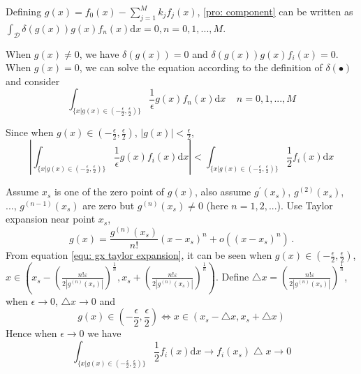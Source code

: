 Defining $g(x) = f_0(x) - \sum_{j=1}^{M} k_jf_j(x)$, \eqref{pro: component} can be written as $\int_{\mathcal{D}}\delta(g(x))g(x)f_n(x)\mathrm{d}x = 0, n = 0, 1, ..., M$.

When $g(x) \neq 0$, we have $\delta(g(x)) = 0$ and $\delta(g(x))g(x)f_i(x) = 0$.   When  $g(x) = 0$, we can solve the equation according to the definition of $\delta(\bullet)$ and consider
\begin{equation}
\label{pro: important}
\int_{\{x|g(x)\in (-\frac{\epsilon}{2}, \frac{\epsilon}{2})\}} \frac{1}{\epsilon} g(x)f_n(x) \mathrm{d}x\;\;\;\;n=0, 1, ..., M
\end{equation}

Since when $g(x) \in (-\frac{\epsilon}{2}, \frac{\epsilon}{2})$, $|g(x)| < \frac{\epsilon}{2}$,
\begin{equation}|
\int_{\{x|g(x)\in (-\frac{\epsilon}{2}, \frac{\epsilon}{2})\}} \frac{1}{\epsilon} g(x)f_i(x) \mathrm{d}x | <
\int_{\{x|g(x)\in (-\frac{\epsilon}{2}, \frac{\epsilon}{2})\}} \frac{1}{2}f_i(x) \mathrm{d}x
\end{equation}

Assume $x_s$ is one of the zero point of $g(x)$, also assume $g^\prime(x_s)$, $g^{(2)}(x_s)$, ..., $g^{(n-1)}(x_s)$ are zero but $g^{(n)}(x_s) \neq 0$ (here $n = 1, 2, ...$). Use Taylor expansion near point $x_s$,
\begin{equation}
  \label{equ: gx taylor expansion}
  g(x) = \frac{g^{(n)}(x_s)}{n!}(x - x_s)^n + o((x - x_s)^n)\,.
\end{equation}
\def \LEFT{ x_s
  -\left(\frac{n!\varepsilon}{2|g^{(n)}(x_s)|}\right)^{\frac{1}{n}}}
  \def \RIGHT{ x_s
  +\left(\frac{n!\varepsilon}{2|g^{(n)}(x_s)|}\right)^{\frac{1}{n}}}
From equation \eqref{equ: gx taylor expansion}, it can be seen when $g(x)\in (-\frac{\epsilon}{2}, \frac{\epsilon}{2})$, $x \in \left(
      \LEFT, \RIGHT
  \right)$.  Define $\bigtriangleup x = \left(\frac{n!\varepsilon}{2|g^{(n)}(x_s)|}\right)^{\frac{1}{n}}$, when $\epsilon \rightarrow 0$, $\bigtriangleup x \rightarrow 0$ and
\begin{equation}
\label{pro: scale}
g(x) \in (-\frac{\epsilon}{2}, \frac{\epsilon}{2})  \Leftrightarrow x \in (x_s -\bigtriangleup x, x_s + \bigtriangleup x)
\end{equation}
 Hence when $\epsilon \rightarrow 0$ we have
\begin{equation}
\int_{\{x|g(x)\in (-\frac{\epsilon}{2}, \frac{\epsilon}{2})\}} \frac{1}{2}f_i(x) \mathrm{d}x \rightarrow
f_i(x_s)\bigtriangleup x \rightarrow 0
\end{equation}

